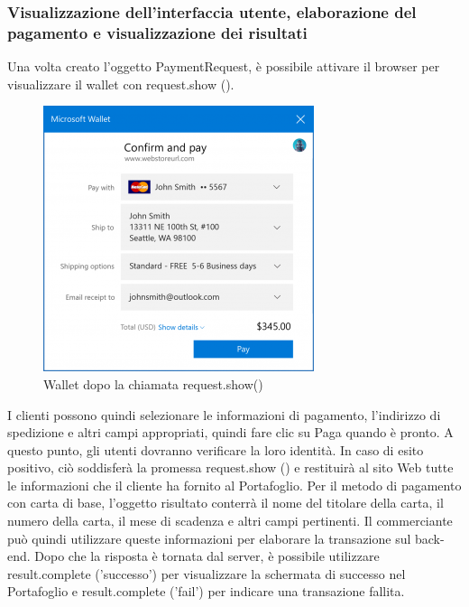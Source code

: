 \documentclass[italian]{article}
\begin{document}
	\subsubsection{Visualizzazione dell'interfaccia utente, elaborazione del pagamento e visualizzazione dei risultati}
	Una volta creato l'oggetto PaymentRequest, è possibile attivare il browser per visualizzare il wallet con request.show (). 
	\begin{figure}
		\centering
		\includegraphics[width=1\linewidth]{wallet1}
		\caption{Wallet dopo la chiamata request.show()}
		\label{fig: Wallet dopo la chiamata request.show()}
	\end{figure}
	\begin{flushleft}
		I clienti possono quindi selezionare le informazioni di pagamento, l'indirizzo di spedizione e altri campi appropriati, quindi fare clic su Paga quando è pronto. A questo punto, gli utenti dovranno verificare la loro identità. In caso di esito positivo, ciò soddisferà la promessa request.show () e restituirà al sito Web tutte le informazioni che il cliente ha fornito al Portafoglio. Per il metodo di pagamento con carta di base, l'oggetto risultato conterrà il nome del titolare della carta, il numero della carta, il mese di scadenza e altri campi pertinenti. Il commerciante può quindi utilizzare queste informazioni per elaborare la transazione sul back-end.
		Dopo che la risposta è tornata dal server, è possibile utilizzare result.complete ('successo') per visualizzare la schermata di successo nel Portafoglio e result.complete ('fail') per indicare una transazione fallita.
	\end{flushleft}
\end{document}
